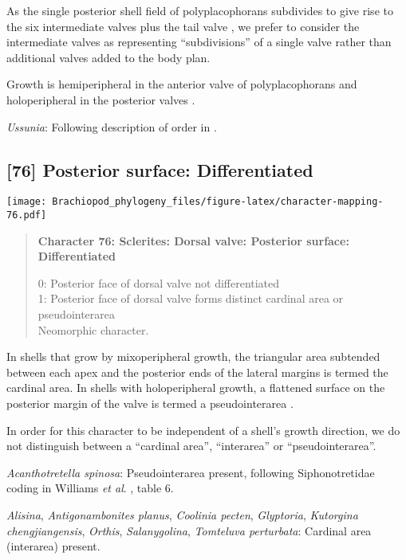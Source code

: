 \documentclass[openany]{book}
\theoremstyle{definition}
\theoremstyle{definition}
\theoremstyle{definition}
\theoremstyle{remark}
\begin{document}
As the single posterior shell field of polyplacophorans subdivides to
give rise to the six intermediate valves plus the tail valve
\citep{Wanninger2002C}, we prefer to consider the intermediate valves as
representing ``subdivisions'' of a single valve rather than additional
valves added to the body plan.

Growth is hemiperipheral in the anterior valve of polyplacophorans and
holoperipheral in the posterior valves \citep{Schwabe2010, Connors2012}.

\hypertarget{Ussunia-coding-75}{}
\emph{Ussunia}: Following description of order in
\citet{Williams2000LinguliformeaCraniiformea}.

\subsection*{{[}76{]} Posterior surface:
Differentiated}\label{posterior-surface-differentiated}

\texttt{[image: Brachiopod\_phylogeny\_files/figure-latex/character-mapping-76.pdf]}

\begin{quote}
\textbf{Character 76: Sclerites: Dorsal valve: Posterior surface:
Differentiated}

0: Posterior face of dorsal valve not differentiated\\
1: Posterior face of dorsal valve forms distinct cardinal area or
pseudointerarea\\
Neomorphic character.
\end{quote}

In shells that grow by mixoperipheral growth, the triangular area
subtended between each apex and the posterior ends of the lateral
margins is termed the cardinal area. In shells with holoperipheral
growth, a flattened surface on the posterior margin of the valve is
termed a pseudointerarea
\citep[paraphrasing][]{Williams1997Introduction}.

In order for this character to be independent of a shell's growth
direction, we do not distinguish between a ``cardinal area'',
``interarea'' or ``pseudointerarea''.

\hypertarget{Acanthotretella_spinosa-coding-76}{}
\emph{Acanthotretella spinosa}: Pseudointerarea present, following
Siphonotretidae coding in Williams \emph{et al}.
\citeyearpar{Williams2000LinguliformeaCraniiformea}, table 6.

\hypertarget{Alisina-coding-76}{}
\emph{Alisina}, \emph{Antigonambonites planus}, \emph{Coolinia pecten},
\emph{Glyptoria}, \emph{Kutorgina chengjiangensis}, \emph{Orthis},
\emph{Salanygolina}, \emph{Tomteluva perturbata}: Cardinal area
(interarea) present.
\end{document}
